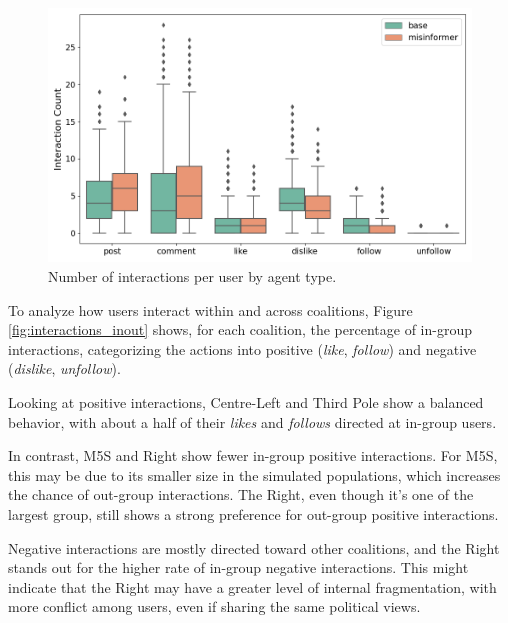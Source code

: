 \begin{figure}[h]
    \centering
    \includegraphics[width=1\linewidth]{Images/Interactions/count_per_user_DefaultRecSys.png}
    \caption{Number of interactions per user by agent type.}
    \label{fig:interactions_count}
\end{figure}

\medskip
To analyze how users interact within and across coalitions, Figure \ref{fig:interactions_inout} shows, for each coalition, the percentage of in-group interactions, categorizing the actions into positive (\textit{like}, \textit{follow}) and negative (\textit{dislike}, \textit{unfollow}).

Looking at positive interactions, Centre-Left and Third Pole show a balanced behavior, with about a half of their \textit{likes} and \textit{follows} directed at in-group users.

In contrast, M5S and Right show fewer in-group positive interactions. 
For M5S, this may be due to its smaller size in the simulated populations, which increases the chance of out-group interactions.
The Right, even though it's one of the largest group, still shows a strong preference for out-group positive interactions.

Negative interactions are mostly directed toward other coalitions, and the Right stands out for the higher rate of in-group negative interactions.
This might indicate that the Right may have a greater level of internal fragmentation, with more conflict among users, even if sharing the same political views.



